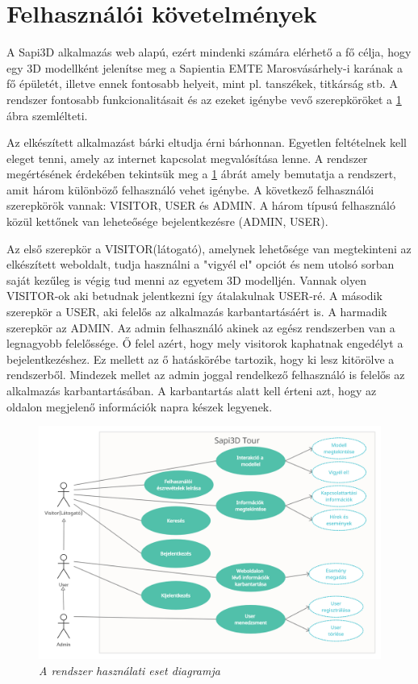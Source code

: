 \section{Felhasználói követelmények}

A Sapi3D alkalmazás web alapú, ezért mindenki számára elérhető
a fő célja, hogy egy 3D modellként jelenítse meg a Sapientia EMTE Marosvásárhely-i karának a fő épületét, illetve ennek fontosabb helyeit, mint pl. tanszékek, titkárság stb. A rendszer fontosabb funkcionalitásait és az ezeket igénybe vevő szerepköröket a \ref{fig:UseCase} ábra szemlélteti.

Az elkészített alkalmazást bárki eltudja érni bárhonnan. Egyetlen feltételnek kell eleget tenni, amely az internet kapcsolat megvalósítása lenne. A rendszer megértésének érdekében tekintsük meg a \ref{fig:UseCase} ábrát amely bemutatja a rendszert, amit három különböző felhasználó vehet igénybe. A következő felhasználói szerepkörök vannak: VISITOR, USER és ADMIN. A három típusú felhasználó közül kettőnek van leheteősége bejelentkezésre (ADMIN, USER).

Az első szerepkör a VISITOR(látogató), amelynek lehetősége van megtekinteni az elkészített weboldalt, tudja használni a "vigyél el" opciót és nem utolsó sorban saját kezűleg is végig tud menni az egyetem 3D modelljén. Vannak olyen VISITOR-ok aki betudnak jelentkezni így átalakulnak USER-ré. A második szerepkör a USER, aki felelős az alkalmazás karbantartásáért is. A harmadik szerepkör az ADMIN. Az admin felhasználó akinek az egész rendszerben van a legnagyobb felelőssége. Ő felel azért, hogy mely visitorok kaphatnak engedélyt a bejelentkezéshez. Ez mellett az ő hatáskörébe tartozik, hogy ki lesz kitörölve a rendszerből. Mindezek mellet az admin joggal rendelkező felhasználó is felelős az alkalmazás karbantartásában. A karbantartás alatt kell érteni azt, hogy az oldalon megjelenő információk napra készek legyenek.
\begin{figure}[H]
	\centering
	\includegraphics[width=1\linewidth]{figures/images/Sapi3dTourUseCase.png}
	\caption[A rendszer használati eset diagramja]{\textit{A rendszer használati eset diagramja}}
	\label{fig:UseCase}
\end{figure}

